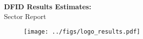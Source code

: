 


\vspace*{3cm}
{\noindent\Huge\textbf{DFID Results Estimates:} \\
Sector Report\par}

\vspace{14cm}

\begin{figure}[htbp]
    \centering
    \texttt{[image: ../figs/logo\_results.pdf]}
\end{figure}


\thispagestyle{empty}

\newpage

